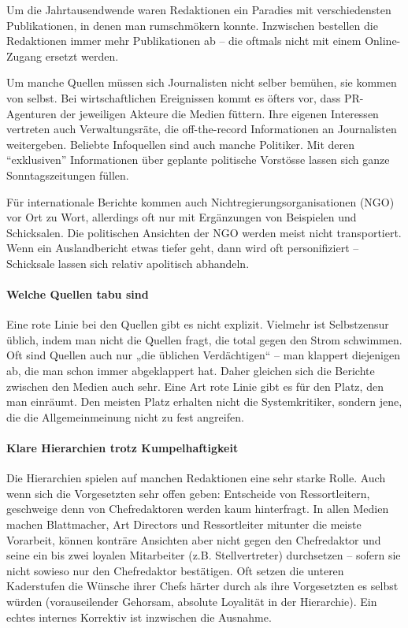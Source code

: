 Um die Jahrtausendwende waren Redaktionen ein Paradies mit
verschiedensten Publikationen, in denen man rumschmökern konnte.
Inzwischen bestellen die Redaktionen immer mehr Publikationen ab -- die
oftmals nicht mit einem Online-Zugang ersetzt werden.

Um manche Quellen müssen sich Journalisten nicht selber bemühen, sie
kommen von selbst. Bei wirtschaftlichen Ereignissen kommt es öfters vor,
dass PR-Agenturen der jeweiligen Akteure die Medien füttern. Ihre
eigenen Interessen vertreten auch Verwaltungsräte, die off-the-record
Informationen an Journalisten weitergeben. Beliebte Infoquellen sind
auch manche Politiker. Mit deren ``exklusiven'' Informationen über
geplante politische Vorstösse lassen sich ganze Sonntags­zeitungen
füllen.

Für internationale Berichte kommen auch Nichtregierungsorganisationen
(NGO) vor Ort zu Wort, allerdings oft nur mit Ergänzungen von Beispielen
und Schicksalen. Die politischen Ansichten der NGO werden meist nicht
transportiert. Wenn ein Auslandbericht etwas tiefer geht, dann wird oft
personifiziert -- Schicksale lassen sich relativ apolitisch abhandeln.

\hypertarget{welche-quellen-tabu-sind}{%
\paragraph{Welche Quellen tabu sind}\label{welche-quellen-tabu-sind}}

Eine rote Linie bei den Quellen gibt es nicht explizit. Vielmehr ist
Selbstzensur üblich, indem man nicht die Quellen fragt, die total gegen
den Strom schwimmen. Oft sind Quellen auch nur „die üblichen
Verdächtigen`` -- man klappert diejenigen ab, die man schon immer
abgeklappert hat. Daher gleichen sich die Berichte zwischen den Medien
auch sehr. Eine Art rote Linie gibt es für den Platz, den man einräumt.
Den meisten Platz erhalten nicht die Systemkritiker, sondern jene, die
die Allgemeinmeinung nicht zu fest angreifen.

\hypertarget{klare-hierarchien-trotz-kumpelhaftigkeit}{%
\paragraph{Klare Hierarchien trotz
Kumpelhaftigkeit}\label{klare-hierarchien-trotz-kumpelhaftigkeit}}

Die Hierarchien spielen auf manchen Redaktionen eine sehr starke Rolle.
Auch wenn sich die Vorgesetzten sehr offen geben: Entscheide von
Ressortleitern, geschweige denn von Chefredaktoren werden kaum
hinterfragt. In allen Medien machen Blattmacher, Art Directors und
Ressortleiter mitunter die meiste Vorarbeit, können konträre Ansichten
aber nicht gegen den Chefredaktor und seine ein bis zwei loyalen
Mitarbeiter (z.B. Stellvertreter) durchsetzen -- sofern sie nicht
sowieso nur den Chefredaktor bestätigen. Oft setzen die unteren
Kaderstufen die Wünsche ihrer Chefs härter durch als ihre Vorgesetzten
es selbst würden (vorauseilender Gehorsam, absolute Loyalität in der
Hierarchie). Ein echtes internes Korrektiv ist inzwischen die Ausnahme.

